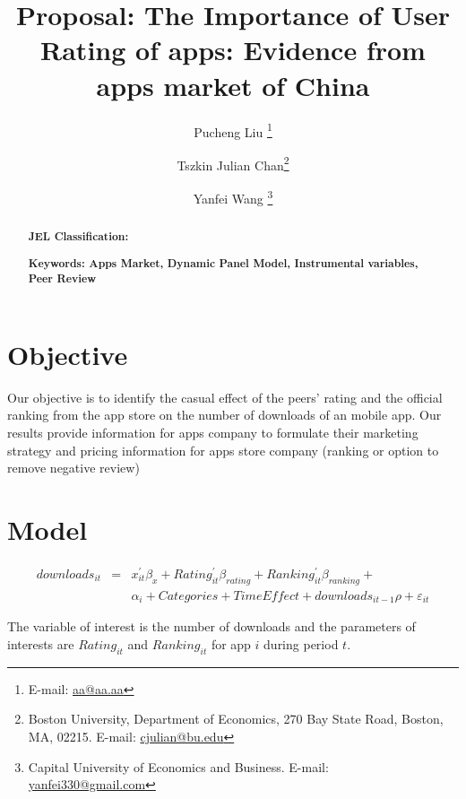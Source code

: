\documentclass[11pt,twoside]{article}
\title{Proposal: The Importance of User Rating of apps: Evidence from apps market of China }
\author { 
	Pucheng Liu \footnote{E-mail:  \protect\url{aa@aa.aa}} 
	\and Tszkin Julian Chan\footnote{Boston University, Department of Economics, 270 Bay State Road, Boston, MA, 02215. E-mail: \protect\url{cjulian@bu.edu}} 
	\and Yanfei Wang \footnote{ Capital University of Economics and Business. E-mail: \protect\url{yanfei330@gmail.com}} 
}
\begin{document}
\maketitle
\begin{abstract}
\noindent \textbf{JEL Classification: } 

\noindent \textbf{Keywords: Apps Market, Dynamic Panel Model, Instrumental variables, Peer Review}  

\end{abstract}
\newpage


\section{Objective}
Our objective is to identify the casual effect of the peers' rating and the official ranking from the app store on the number of downloads of an mobile app. Our results provide information for apps company to formulate their marketing strategy and pricing information for apps store company (ranking or option to remove negative review)

\section{Model}

\begin{eqnarray} \label{eq:basic_eq}
	downloads_{it} &=& x_{it}^{'} \beta_{x} + Rating_{it}^{'} \beta_{rating} + Ranking_{it}^{'} \beta_{ranking} + \\
	&& \alpha_i + Categories + TimeEffect +  downloads_{it-1} \rho + \varepsilon_{it}
\end{eqnarray}
	
	The variable of interest is the number of downloads and the parameters of interests are $Rating_{it}$ and $Ranking_{it}$ for app $i$ during period $t$. 
\end{document}
